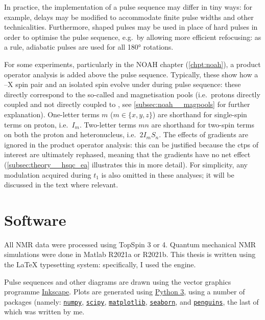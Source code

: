 In practice, the implementation of a pulse sequence may differ in tiny ways: for example, delays may be modified to accommodate finite pulse widths and other technicalities.
Furthermore, shaped pulses may be used in place of hard pulses in order to optimise the pulse sequence, e.g.\ by allowing more efficient refocusing: as a rule, adiabatic pulses are used for all \carbon{} \ang{180} rotations.

For some experiments, particularly in the NOAH chapter (\cref{chpt:noah}), a product operator analysis is added above the pulse sequence.
Typically, these show how a \proton{}--X spin pair and an isolated \proton{} spin evolve under during pulse sequence: these directly correspond to the so-called  and  magnetisation pools (i.e.\ protons directly coupled and not directly coupled to \carbon{}, see \cref{subsec:noah__magpools} for further explanation).
One-letter terms $m$ ($m \in \{x, y, z\}$) are shorthand for single-spin terms on proton, i.e.\ $I_m$.
Two-letter terms $mn$ are shorthand for two-spin terms on both the proton and heteronucleus, i.e.\ $2I_mS_n$.
The effects of gradients are ignored in the product operator analysis: this can be justified because the \acp{ctp} of interest are ultimately rephased, meaning that the gradients have no net effect (\cref{subsec:theory__hsqc_ea} illustrates this in more detail).
For simplicity, any modulation acquired during $t_1$ is also omitted in these analyses; it will be discussed in the text where relevant.

\section*{Software}

All NMR data were processed using TopSpin 3 or 4.
Quantum mechanical NMR simulations were done in Matlab R2021a or R2021b.
This thesis is written using the \LaTeX{} typesetting system: specifically, I used the \LuaLaTeX{} engine.

Pulse sequences and other diagrams are drawn using the vector graphics programme \href{https://inkscape.org/}{Inkscape}.
Plots are generated using \href{https://www.python.org/}{Python 3}, using a number of packages (namely: \href{https://github.com/numpy/numpy}{\texttt{numpy}}, \href{https://github.com/scipy/scipy}{\texttt{scipy}}, \href{https://github.com/matplotlib/matplotlib}{\texttt{matplotlib}}, \href{https://github.com/mwaskom/seaborn}{\texttt{seaborn}}, and \href{https://github.com/yongrenjie/penguins}{\texttt{penguins}}, the last of which was written by me.


